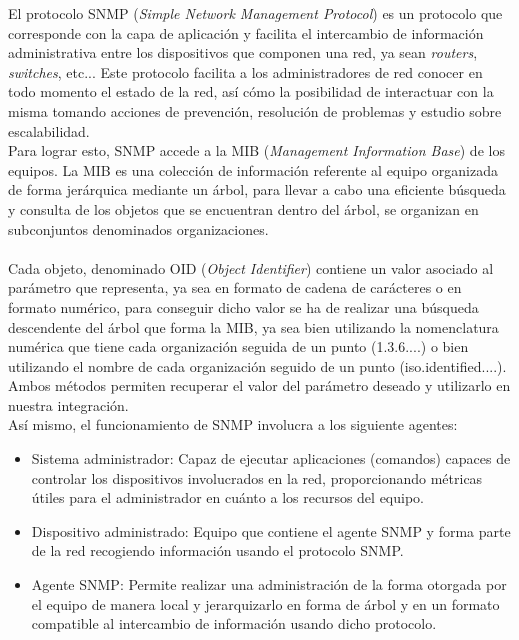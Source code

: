 El protocolo SNMP (\textit{Simple Network Management Protocol}) es un protocolo que corresponde con la capa de aplicación y facilita el intercambio de información administrativa entre los dispositivos que componen una red, ya sean \textit{routers}, \textit{switches}, etc... Este protocolo facilita a los administradores de red conocer en todo momento el estado de la red, así cómo la posibilidad de interactuar con la misma tomando acciones de prevención, resolución de problemas y estudio sobre escalabilidad.\\

Para lograr esto, SNMP accede a la MIB (\textit{Management Information Base}) de los equipos. La MIB es una colección de información referente al equipo organizada de forma jerárquica mediante un árbol, para llevar a cabo una eficiente búsqueda y consulta de los objetos que se encuentran dentro del árbol, se organizan en subconjuntos denominados organizaciones.\\\\

Cada objeto, denominado OID (\textit{Object Identifier}) contiene un valor asociado al parámetro que representa, ya sea en formato de cadena de carácteres o en formato numérico, para conseguir dicho valor se ha de realizar una búsqueda descendente del árbol que forma la MIB, ya sea bien utilizando la nomenclatura numérica que tiene cada organización seguida de un punto (1.3.6....) o bien utilizando el nombre de cada organización seguido de un punto (iso.identified....). Ambos métodos permiten recuperar el valor del parámetro deseado y utilizarlo en nuestra integración.\\

Así mismo, el funcionamiento de SNMP involucra a los siguiente agentes:

\begin{itemize}
	\item Sistema administrador: Capaz de ejecutar aplicaciones (comandos) capaces de controlar los dispositivos involucrados en la red, proporcionando métricas útiles para el administrador en cuánto a los recursos del equipo.
	\item Dispositivo administrado: Equipo que contiene el agente SNMP y forma parte de la red recogiendo información usando el protocolo SNMP.
	\item Agente SNMP: Permite realizar una administración de la forma otorgada por el equipo de manera local y jerarquizarlo en forma de árbol y en un formato compatible al intercambio de información usando dicho protocolo.
\end{itemize}

